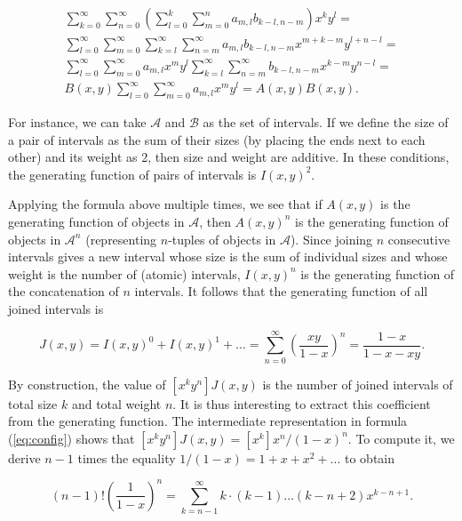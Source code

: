 \documentclass{article}
\begin{document}
\begin{gather*}
\sum_{k=0}^\infty \sum_{n=0}^\infty \left( \sum_{l=0}^k \sum_{m=0}^n
  a_{m,l}b_{k-l,n-m}\right) x^k y^l = \\ 
\sum_{l=0}^\infty \sum_{m=0}^\infty \sum_{k=l}^\infty \sum_{n=m}^\infty
  a_{m,l}b_{k-l,n-m}x^{m + k-m} y^{l + n-l} = \\
\sum_{l=0}^\infty \sum_{m=0}^\infty a_{m,l} x^m y^l
  \sum_{k=l}^\infty \sum_{n=m}^\infty
  b_{k-l,n-m}x^{k-m} y^{n-l} = \\
B(x,y) \sum_{l=0}^\infty \sum_{m=0}^\infty a_{m,l} x^m y^l
 = A(x,y)B(x,y).
\end{gather*}

For instance, we can take $\mathcal{A}$ and $\mathcal{B}$ as the set of
intervals. If we define the size of a pair of intervals as the sum of
their sizes (by placing the ends next to each other) and its weight as 2,
then size and weight are additive. In these conditions, the generating
function of pairs of intervals is $I(x,y)^2$.

Applying the formula above multiple times, we see that if $A(x,y)$ is the
generating function of objects in $\mathcal{A}$, then $A(x,y)^n$ is the
generating function of objects in $\mathcal{A}^n$ (representing $n$-tuples
of objects in $\mathcal{A}$). Since joining $n$ consecutive intervals
gives a new interval whose size is the sum of individual sizes and whose
weight is the number of (atomic) intervals, $I(x,y)^n$ is the generating
function of the concatenation of $n$ intervals. It follows that the
generating function of all joined intervals is

\begin{equation}
\label{eq:config}
J(x,y) = I(x,y)^0 + I(x,y)^1 +\ldots
= \sum_{n=0}^\infty \left( \frac{xy}{1-x} \right)^n
= \frac{1-x}{1 - x - xy}.
\end{equation}

By construction, the value of $[x^ky^n]J(x,y)$ is the number of joined
intervals of total size $k$ and total weight $n$. It is thus interesting to
extract this coefficient from the generating function.  The intermediate
representation in formula (\ref{eq:config}) shows that $[x^ky^n]J(x,y) =
[x^k] x^n/(1-x)^n$. To compute it, we derive $n-1$ times the equality
$1/(1-x) = 1 + x + x^2 + \ldots$ to obtain

\begin{equation*}
(n-1)! \left( \frac{1}{1-x} \right)^n =
\sum_{k=n-1}^\infty k \cdot (k-1) \ldots (k-n+2) x^{k-n+1}.
\end{equation*}
\end{document}
